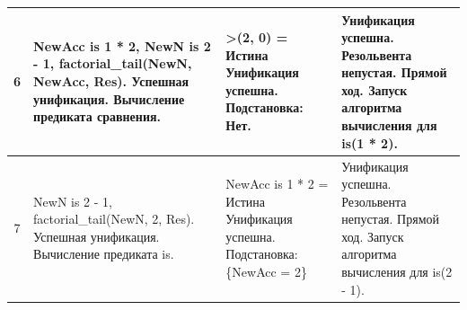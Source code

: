 \begin{tabularx}{\textwidth}{|c|>{\small}X|>{\small}X|>{\small}X|}
	6                                                                                  &
	NewAcc is 1 * 2, \newline
	NewN is 2 - 1, \newline
	factorial\_tail(NewN, NewAcc, Res). \newline
	Успешная унификация. \newline
	Вычисление предиката сравнения.                                                    &
	>(2, 0) = \newline
	Истина \newline
	Унификация успешна. \newline
	Подстановка: \newline
	Нет.                                                                               &
	Унификация успешна. \newline
	Резольвента непустая. \newline
	Прямой ход. \newline
	Запуск алгоритма вычисления для is(1 * 2).                                                 \\
	\hline

	7                                                                                  &
	NewN is 2 - 1, \newline
	factorial\_tail(NewN, 2, Res). \newline
	Успешная унификация. \newline
	Вычисление предиката is.                                                           &
	NewAcc is 1 * 2 = \newline
	Истина \newline
	Унификация успешна. \newline
	Подстановка: \newline
	\{NewAcc = 2\}                                                                     &
	Унификация успешна. \newline
	Резольвента непустая. \newline
	Прямой ход. \newline
	Запуск алгоритма вычисления для is(2 - 1).                                                 \\
	\hline


\end{tabularx}
